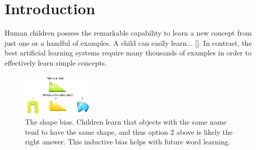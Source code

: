 \section{Introduction}

Human children possess the remarkable capability to learn a new concept from just one or a
handful of examples. A child can easily learn... [].
In contrast, the best artificial learning systems require many thousands of examples
in order to effectively learn simple concepts.
\begin{figure}[h!]
    \begin{center}
        \includegraphics[width=0.3\textwidth]{figures/shape_bias_demo.pdf}
    \end{center}
    \caption{The shape bias. Children learn that objects with the same name tend to have the
    same shape, and thus option 2 above is likely the right answer. This
    inductive bias helps with future word learning.}
    \label{fig:shape_bias_demo}
\end{figure}

